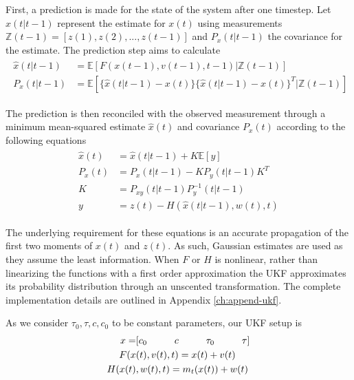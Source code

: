 First, a prediction is made for the state of the system after one timestep. Let $\hat{x}(t\vert t-1)$ represent the estimate for $x(t)$ using measurements $\mathbb{Z}(t-1)=[z(1), z(2), ..., z(t-1)]$ and $P_{x}(t\vert t-1)$ the covariance for the estimate. The prediction step aims to calculate
\begin{align}\begin{split}
  \hat{x}(t\vert t-1) &= \mathbb{E}[F(x(t-1), v(t-1), t-1)\vert \mathbb{Z}(t-1)]\\
  P_{x}(t\vert t-1) &= \mathbb{E}[\{ \hat{x}(t\vert t-1) - x(t) \} \{ \hat{x}(t\vert t-1) - x(t) \}^T \vert \mathbb{Z}(t-1)]
\end{split}\end{align}

The prediction is then reconciled with the observed measurement through a minimum mean-squared estimate $\hat{x}(t)$ and covariance $P_{x}(t)$ according to the following equations
\begin{align}
\begin{split}
  \hat{x}(t) &= \hat{x}(t\vert t-1) + K \mathbb{E}[y] \\
  P_{x}(t) &= P_{x}(t\vert t-1) - KP_{y}(t\vert t-1) K^T\\
  K &= P_{xy}(t\vert t-1) P_{y}^{-1}(t\vert t-1)\\
  y &= z(t) - H(\hat{x}(t\vert t-1) , w(t), t)
\end{split}
\end{align}

The underlying requirement for these equations is an accurate propagation of the first two moments of $x(t)$ and $z(t)$. As such, Gaussian estimates are used as they assume the least information. When $F$ or $H$ is nonlinear, rather than linearizing the functions with a first order approximation the UKF approximates its probability distribution through an unscented transformation. The complete implementation details are outlined in Appendix \ref{ch:append-ukf}.

As we consider $\tau_0, \tau, c, c_0$ to be constant parameters, our UKF setup is
\begin{align}
\begin{split}
  x = &[c_0 \hspace*{1cm} c \hspace*{1cm} \tau_0 \hspace*{1cm} \tau]\\
  F(x&(t), v(t), t) = x(t) + v(t)\\
  H(x(t)&, w(t), t) = m_t(x(t)) + w(t)
\end{split}
\end{align}

